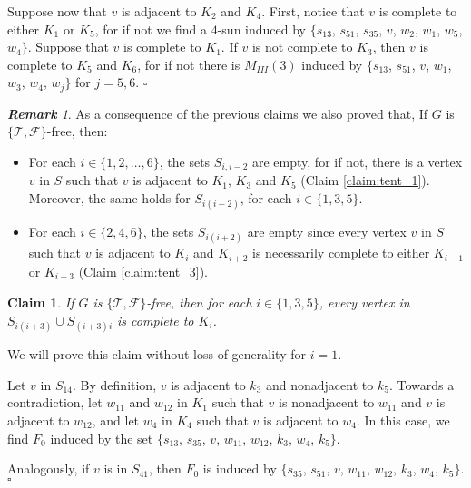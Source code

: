 \documentclass[12pt]{book}
\theoremstyle{plain}
\newtheorem{claim}[teo]{Claim}
\theoremstyle{remark}
\newtheorem{remark}[teo]{\textbf{\textit{Remark}}}
\newcommand*{\QED}{\hfill\ensuremath{\square}}%
\begin{document}
	Suppose now that $v$ is adjacent to $K_2$ and $K_4$.
	First, notice that $v$ is complete to either $K_1$ or $K_5$, for if not we find a $4$-sun induced by $\{ s_{13}$, $s_{51}$, $s_{35}$, $v$, $w_2$, $w_1$, $w_5$, $w_4 \}$.
	Suppose that $v$ is complete to $K_1$. If $v$ is not complete to $K_3$, then $v$ is complete to $K_5$ and $K_6$, for if not there is $M_{III}(3)$ induced by $\{ s_{13}$, $s_{51}$, $v$, $w_1$, $w_3$, $w_4$, $w_j \}$ for $j=5,6$. \QED
	
	\begin{remark}
		As a consequence of the previous claims we also proved that, If $G$ is $\{ \mathcal{T}, \mathcal{F} \}$-free, then:
		\begin{itemize}
			\item For each $i \in \{1, 2, \ldots, 6 \}$, the sets $S_{i,i-2}$ are empty, for if not, there is a vertex $v$ in $S$ such that $v$ is adjacent to $K_1$, $K_3$ and $K_5$ (Claim \ref{claim:tent_1}). Moreover, the same holds for $S_{i(i-2)}$, for each $i \in \{1, 3, 5\}$.
			\item For each $i \in \{2, 4, 6 \}$, the sets $S_{i(i+2)}$ are empty since every vertex $v$ in $S$ such that $v$ is adjacent to $K_i$ and $K_{i+2}$ is necessarily complete to either $K_{i-1}$ or $K_{i+3}$ (Claim \ref{claim:tent_3}).
		\end{itemize}
	\end{remark}			
		
	\begin{claim} \label{claim:tent_4}
		If $G$ is $\{ \mathcal{T}, \mathcal{F} \}$-free, then for each $i \in \{1, 3, 5\}$, every vertex in $S_{i(i+3)} \cup S_{(i+3)i}$ is complete to $K_i$.
	\end{claim}
	
	   We will prove this claim without loss of generality for $i = 1$.

    Let $v$ in $S_{14}$. By definition, $v$ is adjacent to $k_3$ and nonadjacent to $k_5$. Towards a contradiction, let $w_{11}$ and $w_{12}$ in $K_1$ such that $v$ is nonadjacent to $w_{11}$ and $v$ is adjacent to $w_{12}$, and let $w_4$ in $K_4$ such that $v$ is adjacent to $w_4$. In this case, we find $F_0$ induced by the set $\{ s_{13}$, $s_{35}$, $v$, $w_{11}$, $w_{12}$, $k_3$, $w_4$, $k_5 \}$.

    Analogously, if $v$ is in $S_{41}$, then $F_0$ is induced by $\{ s_{35}$, $s_{51}$, $v$, $w_{11}$, $w_{12}$, $k_3$, $w_4$, $k_5 \}$. \QED
	
\end{document}
